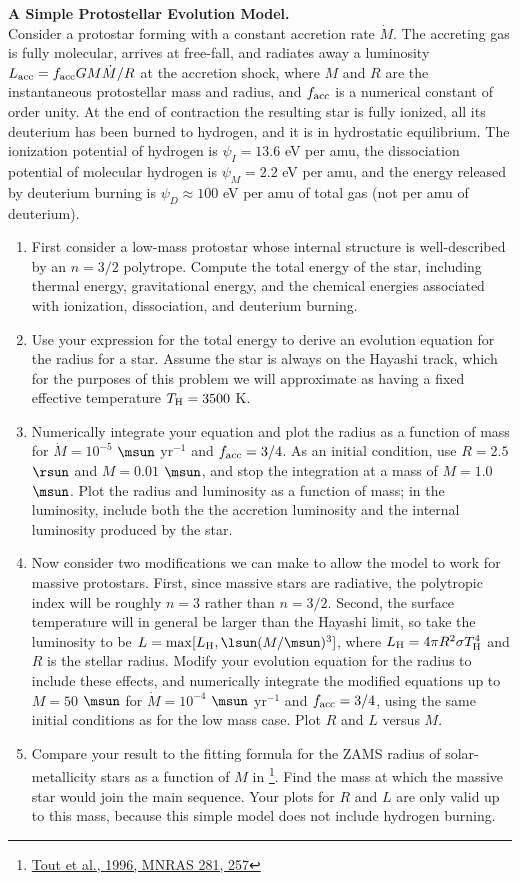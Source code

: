 \documentclass[twoside]{tufte-book} %
\begin{document}
\item {\bf A Simple Protostellar Evolution Model.}\\
Consider a protostar forming with a constant accretion rate $\dot{M}$. The accreting gas is fully molecular, arrives at free-fall, and radiates away a luminosity $L_{\rm acc} = f_{\rm acc} G M \dot{M}/R$ at the accretion shock, where $M$ and $R$ are the instantaneous protostellar mass and radius, and $f_{\rm acc}$ is a numerical constant of order unity. At the end of contraction the resulting star is fully ionized, all its deuterium has been burned to hydrogen, and it is in hydrostatic equilibrium. The ionization potential of hydrogen is $\psi_I = 13.6$ eV per amu, the dissociation potential of molecular hydrogen is $\psi_M=2.2$ eV per amu, and the energy released by deuterium burning is $\psi_D\approx 100$ eV per amu of total gas (not per amu of deuterium).
\begin{enumerate}
\item First consider a low-mass protostar whose internal structure is well-described by an $n=3/2$ polytrope. Compute the total energy of the star, including thermal energy, gravitational energy, and the chemical energies associated with ionization, dissociation, and deuterium burning.
\item Use your expression for the total energy to derive an evolution equation for the radius for a star. Assume the star is always on the Hayashi track, which for the purposes of this problem we will approximate as having a fixed effective temperature $T_{\rm H} = 3500$ K.
\item Numerically integrate your equation and plot the radius as a function of mass for $\dot{M} = 10^{-5}$ $\msun$ yr$^{-1}$ and $f_{\rm acc}=3/4$. As an initial condition, use $R=2.5$ $\rsun$ and $M=0.01$ $\msun$, and stop the integration at a mass of $M=1.0$ $\msun$. Plot the radius and luminosity as a function of mass; in the luminosity, include both the the accretion luminosity and the internal luminosity produced by the star.
\item Now consider two modifications we can make to allow the model to work for massive protostars. First, since massive stars are radiative, the polytropic index will be roughly $n=3$ rather than $n=3/2$. Second, the surface temperature will in general be larger than the Hayashi limit, so take the luminosity to be $L=\max[L_{\rm H}, \lsun(M/\msun)^3]$, where $L_{\rm H}=4\pi R^2 \sigma T_{\rm H}^4$ and $R$ is the stellar radius. Modify your evolution equation for the radius to include these effects, and numerically integrate the modified equations up to $M=50$ $\msun$ for $\dot{M} = 10^{-4}$ $\msun$ yr$^{-1}$ and $f_{\rm acc}=3/4$, using the same initial conditions as for the low mass case. Plot $R$ and $L$ versus $M$.
\item Compare your result to the fitting formula for the ZAMS radius of solar-metallicity stars as a function of $M$ in \citet{tout96a}\footnote{\href{http://adsabs.harvard.edu/abs/1996MNRAS.281..257T}{Tout et al., 1996, MNRAS 281, 257}}. Find the mass at which the massive star would join the main sequence. Your plots for $R$ and $L$ are only valid up to this mass, because this simple model does not include hydrogen burning.
\end{enumerate}
\end{document}
